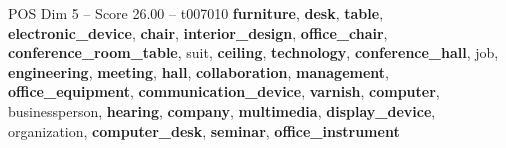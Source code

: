 \begin{textsample}{POS Dim 5 – Score 26.00 – t007010}  \label{ex:f5_pos_037}
\textbf{furniture}, \textbf{desk}, \textbf{table}, \textbf{electronic\_device}, \textbf{chair}, \textbf{interior\_design}, \textbf{office\_chair}, \textbf{conference\_room\_table}, suit, \textbf{ceiling}, \textbf{technology}, \textbf{conference\_hall}, job, \textbf{engineering}, \textbf{meeting}, \textbf{hall}, \textbf{collaboration}, \textbf{management}, \textbf{office\_equipment}, \textbf{communication\_device}, \textbf{varnish}, \textbf{computer}, businessperson, \textbf{hearing}, \textbf{company}, \textbf{multimedia}, \textbf{display\_device}, organization, \textbf{computer\_desk}, \textbf{seminar}, \textbf{office\_instrument}

\end{textsample}
